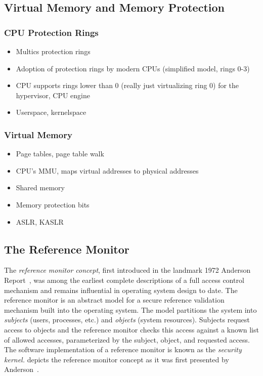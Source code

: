 \subsection{Virtual Memory and Memory Protection}%
\label{ss:virtual-memory}

\subsubsection*{CPU Protection Rings}

\begin{inprogress}
  \begin{itemize}
    \item Multics protection rings
    \item Adoption of protection rings by modern CPUs (simplified model, rings 0-3)
    \item CPU supports rings lower than 0 (really just virtualizing ring 0) for the hypervisor, CPU engine
    \item Userspace, kernelspace
  \end{itemize}
\end{inprogress}

\subsubsection*{Virtual Memory}

\begin{inprogress}
  \begin{itemize}
    \item Page tables, page table walk
    \item CPU's MMU, maps virtual addresses to physical addresses
    \item Shared memory
    \item Memory protection bits
    \item ASLR, KASLR
  \end{itemize}
\end{inprogress}

\subsection{The Reference Monitor}%
\label{ss:refmon}

The \textit{reference monitor concept}, first introduced in the landmark 1972 Anderson
Report~\cite{anderson1972_report}, was among the earliest complete descriptions of a full
access control mechanism and remains influential in operating system design to date. The
reference monitor is an abstract model for a secure reference validation mechanism built
into the operating system. The model partitions the system into \textit{subjects} (users,
processes, etc.) and \textit{objects} (system resources).  Subjects request access to
objects and the reference monitor checks this access against a known list of allowed
accesses, parameterized by the subject, object, and requested access. The software
implementation of a reference monitor is known as the \textit{security kernel.}
 depicts the reference monitor concept as it was first presented by
Anderson~\cite{anderson1972_report}.

